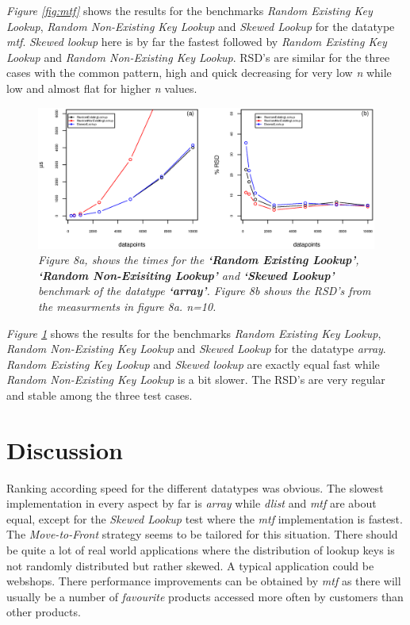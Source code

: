 \documentclass[a4paper,11pt,twoside]{article}
\begin{document}
\textit{Figure \ref{fig:mtf}} shows the results for the benchmarks
\emph{Random Existing Key Lookup}, \emph{Random Non-Existing Key Lookup} and
\emph{Skewed Lookup} for the datatype \emph{mtf}. \emph{Skewed lookup} here is by 
far the fastest followed by \emph{Random Existing Key Lookup} and 
\emph{Random Non-Existing Key Lookup}. RSD's are similar for the three
cases with the common pattern, high and quick decreasing for very low
\textit{n} while low and almost flat for higher \textit{n} values.

\begin{figure}[H] 
\centering 
\includegraphics[width=\textwidth]{figures/fig8.eps}
\caption{\textit{Figure 8a, shows the times for the \textbf{`Random Existing
    Lookup'}, \textbf{`Random Non-Exisiting Lookup'} and
  \textbf{`Skewed Lookup'} benchmark of the datatype \textbf{`array'}. Figure 8b shows the RSD's from the measurments
in figure 8a. n=10.}}
\label{fig:array}
\end{figure}

\textit{Figure \ref{fig:array}} shows the results for the benchmarks
\emph{Random Existing Key Lookup}, \emph{Random Non-Existing Key Lookup} and
\emph{Skewed Lookup} for the datatype \emph{array}. \emph{Random Existing Key Lookup} and
\emph{Skewed lookup} are exactly equal fast while \emph{Random Non-Existing Key
Lookup} is a bit slower. The RSD's are very regular and stable among
the three test cases.


\section{Discussion}
Ranking according speed for the different datatypes was obvious. 
The slowest implementation in every aspect by far is
\emph{array} while \emph{dlist} and \emph{mtf} are about equal, except for the
\emph{Skewed Lookup} test where the \emph{mtf} implementation is fastest. 
The \emph{Move-to-Front} strategy seems to be tailored for this
situation. There should be quite a lot of real world
applications where the distribution of lookup keys is not randomly
distributed but rather skewed. A typical application could be webshops.
There performance improvements can be obtained by \emph{mtf} as there will
usually be a number of \emph{favourite} products accessed more often by 
customers than other products.
\end{document}

